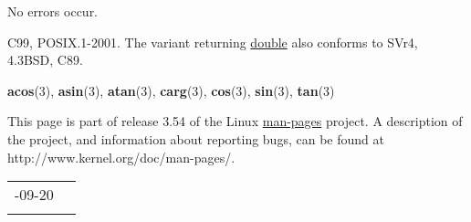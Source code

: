 \documentclass[]{article}
\let\realtextbf=\textbf
\renewcommand{\textbf}[1]{\textcolor{boldcolor}{\realtextbf{#1}}}
\renewcommand{\emph}[1]{\underline{#1}}
\begin{document}
No errors occur.


C99, POSIX.1-2001. The variant returning \emph{double} also conforms to
SVr4, 4.3BSD, C89.


\textbf{acos}(3), \textbf{asin}(3), \textbf{atan}(3), \textbf{carg}(3),
\textbf{cos}(3), \textbf{sin}(3), \textbf{tan}(3)


This page is part of release 3.54 of the Linux \emph{man-pages} project.
A description of the project, and information about reporting bugs, can
be found at http://www.kernel.org/doc/man-pages/.

\begin{longtable}[c]{@{}ll@{}}
\toprule\addlinespace
2010-09-20 &
\\\addlinespace
\bottomrule
\end{longtable}
\end{document}
